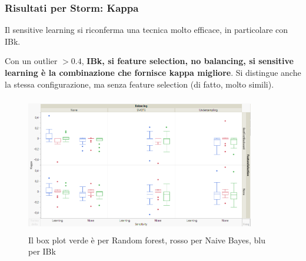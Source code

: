 \documentclass{beamer}
\begin{document}
\begin{frame}
	\frametitle{Risultati per Storm: Kappa}
	
	\fontsize{7pt}{8pt}\selectfont
	
	Il sensitive learning si riconferma una tecnica molto efficace, in particolare con IBk.
	
	Con un outlier $> 0.4$, 
	\textbf{IBk, si feature selection, no balancing, si sensitive learning è la combinazione che fornisce
	kappa migliore}. Si distingue anche la stessa configurazione, ma senza feature selection (di fatto, molto
	simili).
	
	\centering
	\begin{figure}
	\includegraphics[width=10cm, height=6cm]{storm-kappa}
	\caption{Il box plot verde è per Random forest, rosso per Naive Bayes, blu per IBk}
	\end{figure}
\end{frame}
\end{document}
